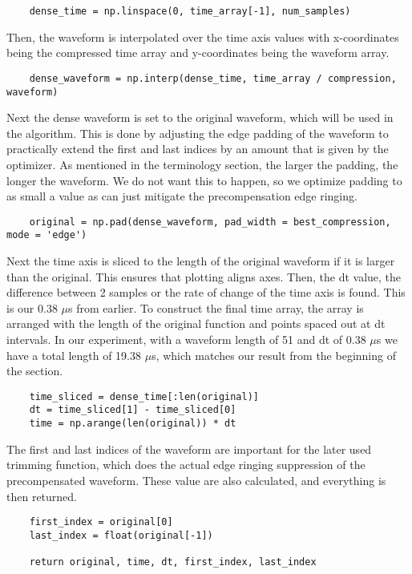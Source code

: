 \begin{verbatim}
    dense_time = np.linspace(0, time_array[-1], num_samples)
\end{verbatim}

Then, the waveform is interpolated over the time axis values with x-coordinates being the compressed time array and y-coordinates being the waveform array.

\begin{verbatim}
    dense_waveform = np.interp(dense_time, time_array / compression, waveform)
\end{verbatim}

Next the dense waveform is set to the original waveform, which will be used in the algorithm. This is done by adjusting the edge padding of the waveform to practically extend the first and last indices by an amount that is given by the optimizer. As mentioned in the terminology section, the larger the padding, the longer the waveform. We do not want this to happen, so we optimize padding to as small a value as can just mitigate the precompensation edge ringing.

\begin{verbatim}
    original = np.pad(dense_waveform, pad_width = best_compression, mode = 'edge')
\end{verbatim}

Next the time axis is sliced to the length of the original waveform if it is larger than the original. This ensures that plotting aligns axes. Then, the dt value, the difference between 2 samples or the rate of change of the time axis is found. This is our 0.38 $\mu$s from earlier. To construct the final time array, the array is arranged with the length of the original function and points spaced out at dt intervals. In our experiment, with a waveform length of 51 and dt of 0.38 $\mu$s we have a total length of 19.38 $\mu$s, which matches our result from the beginning of the section.

\begin{verbatim}
    time_sliced = dense_time[:len(original)]
    dt = time_sliced[1] - time_sliced[0]
    time = np.arange(len(original)) * dt
\end{verbatim}

The first and last indices of the waveform are important for the later used trimming function, which does the actual edge ringing suppression of the precompensated waveform. These value are also calculated, and everything is then returned.

\begin{verbatim}
    first_index = original[0]
    last_index = float(original[-1])

    return original, time, dt, first_index, last_index
\end{verbatim}

